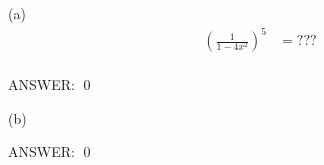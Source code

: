 
(a)
\begin{align*}
\left(
\frac{1}{1 - 4x^2}
\right)^5
&= ??? \\
\end{align*}

ANSWER:
\qed


(b)

ANSWER:
\qed

